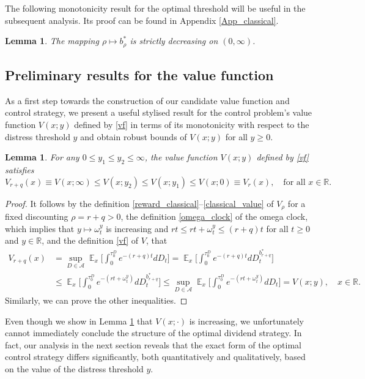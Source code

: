 \documentclass[11pt]{article} %
\newtheorem{lemma}[theorem]{Lemma}
\def\R{\mathbb{R}}
\DeclareMathOperator{\E}{\mathbb E}
\numberwithin{komcounter}{section}
\numberwithin{equation}{section}
\numberwithin{theorem}{section}
\begin{document}
The following monotonicity result for the optimal threshold will be useful in the subsequent analysis. Its proof can be found in Appendix \ref{App_classical}. 
\begin{lemma} \label{lemma_useful_results}
The mapping $\rho \mapsto b^*_{\rho}$ is strictly decreasing on $(0,\infty)$. 
\end{lemma} 



\subsection{Preliminary results for the value function}
\label{sec:bounds}

As a first step towards the construction of our candidate value function and control strategy, we present a useful stylised result for the control problem's value function $V(x;y)$ defined by \eqref{vf} in terms of its monotonicity with respect to the distress threshold $y$ and obtain robust bounds of $V(x;y)$ for all $y \geq 0$. 

\begin{lemma} \label{lem_mono}
For any $0 \leq y_1 \leq y_2 \leq \infty$, the value function $V(x;y)$ defined by \eqref{vf} satisfies 
$$
V_{r+q}(x) \equiv V(x;\infty) \leq V(x;y_2) \leq V(x;y_1) \leq V(x;0) \equiv V_{r}(x), 
\quad \text{for all } x \in \R.
$$
\end{lemma}

\begin{proof}
It follows by the definition \eqref{reward_classical}--\eqref{classical_value} of $V_{\rho}$ for a fixed discounting $\rho = r+q>0$, 
the definition \eqref{omega_clock} of the omega clock, which implies that $y \mapsto \omega^y_t$ is increasing and $rt \leq rt + \omega^y_t \leq (r + q)t$ for all $t \geq 0$ and $y \in \R$, 
and the definition \eqref{vf} of $V$, 
that
\begin{align*} 
V_{r+q}(x) 
&= \sup_{D \in \mathcal{A}} \E_x\bigg[ \int_0^{\tau^D_0} e^{-(r+q)t} dD_t \bigg] 
= \E_x\bigg[ \int_0^{\tau^D_0} e^{-(r+q)t} dD^{b^*_{r+q}}_t \bigg] \\
&\leq \E_x\bigg[ \int_0^{\tau^D_0} e^{-(rt + \omega^y_t)} dD^{b^*_{r+q}}_t \bigg]
\leq \sup_{D \in \mathcal{A}} \E_x\bigg[ \int_0^{\tau^D_0} e^{-(rt + \omega^y_t)} dD_t \bigg]
= V(x;y)
, \quad x \in \R .
\end{align*}
Similarly, we can prove the other inequalities.
\end{proof}

Even though we show in Lemma \ref{lem_mono} that $V(x;\cdot)$ is increasing, we unfortunately cannot immediately conclude the structure of the optimal dividend strategy. 
In fact, our analysis in the next section reveals that the exact form of the optimal control strategy differs significantly, both quantitatively and qualitatively, based on the value of the distress threshold $y$.
\end{document}
